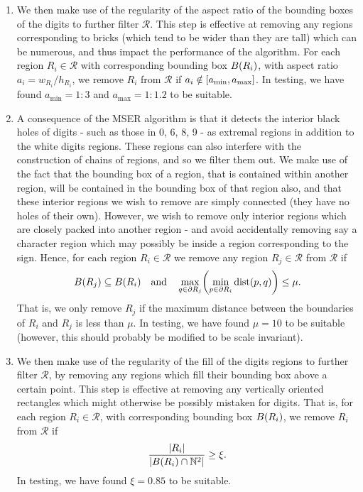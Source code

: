 \documentclass{article}
\begin{document}
\begin{enumerate}
\item
  We then make use of the regularity of the aspect ratio of the bounding boxes
  of the digits to further filter $\mathcal{R}$.
  This step is effective at removing any regions corresponding to bricks (which
  tend to be wider than they are tall) which can be numerous, and thus impact
  the performance of the algorithm.
  For each region $R_{i} \in \mathcal{R}$ with corresponding bounding box
  $B(R_{i})$, with aspect ratio $a_{i} = w_{R_{i}} / h_{R_{i}}$, we remove
  $R_{i}$ from $\mathcal{R}$ if $a_{i} \notin [a_{\min}, a_{\max}]$.
  In testing, we have found $a_{\min} = 1:3$ and $a_{\max} = 1:1.2$ to be
  suitable.

\item
  A consequence of the MSER algorithm is that it detects the interior black
  holes of digits - such as those in 0, 6, 8, 9 - as extremal regions in
  addition to the white digits regions.
  These regions can also interfere with the construction of chains of regions,
  and so we filter them out.
  We make use of the fact that the bounding box of a region, that is contained
  within another region, will be contained in the bounding box of that region
  also, and that these interior regions we wish to remove are simply connected
  (they have no holes of their own).
  However, we wish to remove only interior regions which are closely packed into
  another region - and avoid accidentally removing say a character region which
  may possibly be inside a region corresponding to the sign.
  Hence, for each region $R_{i} \in \mathcal{R}$ we remove any region
  $R_{j} \in \mathcal{R}$ from $\mathcal{R}$ if
  \begin{equation*}
    B\lr{R_{j}}
    \subseteq
    B\lr{R_{i}}
    \qq{and}
    \max_{q \in \partial R_{j}}
    \lr[\bigg]
    {
      \min_{p \in \partial R_{i}}
      \mathrm{dist}\lr{p, q}
    }
    \leq
    \mu
    .
  \end{equation*}
  That is, we only remove $R_{j}$ if the maximum distance between the boundaries
  of $R_{i}$ and $R_{j}$ is less than $\mu$.
  In testing, we have found $\mu = 10$ to be suitable (however, this should
  probably be modified to be scale invariant).

\item
  We then make use of the regularity of the fill of the digits regions to
  further filter $\mathcal{R}$, by removing any regions which fill their
  bounding box above a certain point.
  This step is effective at removing any vertically oriented rectangles which
  might otherwise be possibly mistaken for digits.
  That is, for each region $R_{i} \in \mathcal{R}$, with corresponding bounding
  box $B(R_{i})$, we remove $R_{i}$ from $\mathcal{R}$ if
  \begin{equation*}
    \frac
    {
      \lvert
        R_{i}
      \rvert
    }
    {
      \lvert
        B(R_{i})
        \cap
        \mathbb{N}^{2}
      \rvert
    }
    \geq
    \xi
    .
  \end{equation*}
  In testing, we have found $\xi = 0.85$ to be suitable.


\end{enumerate}
\end{document}
